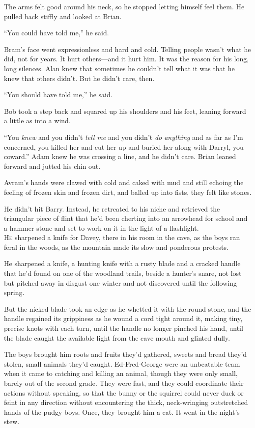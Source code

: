 The arms felt good around his neck, so he stopped letting himself feel
them.  He pulled back stiffly and looked at Brian.

``You could have told me,'' he said.

Bram's face went expressionless and hard and cold.  Telling people
wasn't what he did, not for years.  It hurt others---and it hurt him. 
It was the reason for his long, long silences.  Alan knew that
sometimes he couldn't tell what it was that he knew that others
didn't.  But he didn't care, then.

``You should have told me,'' he said.

Bob took a step back and squared up his shoulders and his feet,
leaning forward a little as into a wind.

``You \textit{knew} and you didn't \textit{tell me} and you didn't
\textit{do anything} and as far as I'm concerned, you killed her and
cut her up and buried her along with Darryl, you coward.'' Adam knew
he was crossing a line, and he didn't care.  Brian leaned forward and
jutted his chin out.

Avram's hands were clawed with cold and caked with mud and still
echoing the feeling of frozen skin and frozen dirt, and balled up into
fists, they felt like stones.

He didn't hit Barry.  Instead, he retreated to his niche and retrieved
the triangular piece of flint that he'd been cherting into an
arrowhead for school and a hammer stone and set to work on it in the
light of a flashlight.
\\
\lettrine[lines=3, lhang=.5, nindent=0pt, findent=2pt]{H}{e} sharpened a knife for Davey, there in his room in the cave, as the
boys ran feral in the woods, as the mountain made its slow and
ponderous protests.

He sharpened a knife, a hunting knife with a rusty blade and a cracked
handle that he'd found on one of the woodland trails, beside a
hunter's snare, not lost but pitched away in disgust one winter and
not discovered until the following spring.

But the nicked blade took an edge as he whetted it with the round
stone, and the handle regained its grippiness as he wound a cord tight
around it, making tiny, precise knots with each turn, until the handle
no longer pinched his hand, until the blade caught the available light
from the cave mouth and glinted dully.

The boys brought him roots and fruits they'd gathered, sweets and
bread they'd stolen, small animals they'd caught.  Ed-Fred-George were
an unbeatable team when it came to catching and killing an animal,
though they were only small, barely out of the second grade.  They
were fast, and they could coordinate their actions without speaking,
so that the bunny or the squirrel could never duck or feint in any
direction without encountering the thick, neck-wringing outstretched
hands of the pudgy boys.  Once, they brought him a cat.  It went in
the night's stew.

